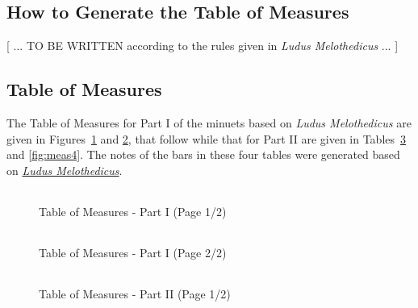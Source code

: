 \documentclass[a4paper,x11names,svgnames,10pt]{article}
\begin{document}
{\subsection{How to Generate the Table of Measures}\label{genMeas}

[ ... TO BE WRITTEN according to the rules given in {\em Ludus Melothedicus} ... ]


\subsection{Table of Measures}\label{tabMeas}

The Table of Measures for Part I of the minuets based on {\em Ludus Melothedicus} are given in Figures~\ref{fig:meas1} and  \ref{fig:meas2}, that follow while that for Part II are given in Tables~\ref{fig:meas3} and \ref{fig:meas4}.  The notes of the bars in these four tables were generated based on \href{https://imslp.org/wiki/Ludus_Melothedicus_(Anonymous)}{{\em Ludus Melothedicus}}.

${}_{}$\\
\vspace{0.10in}
\begin{figure}[H]
	\centering
	\def\svgwidth{0.975\columnwidth}
	
	\caption{Table of Measures - Part I (Page 1/2)}
	\label{fig:meas1}
\end{figure}

\newpage
${}_{}$\\
\vspace{0.10in}
\begin{figure}[H]
	\centering
	\def\svgwidth{0.975\columnwidth}
	
	\caption{Table of Measures - Part I (Page 2/2)}
	\label{fig:meas2}
\end{figure}

${}_{}$\\
\vspace{0.10in}
\begin{figure}[H]
	\centering
	\def\svgwidth{0.975\columnwidth}
	
	\caption{Table of Measures - Part II (Page 1/2)}
	\label{fig:meas3}
\end{figure}

}
\end{document}
